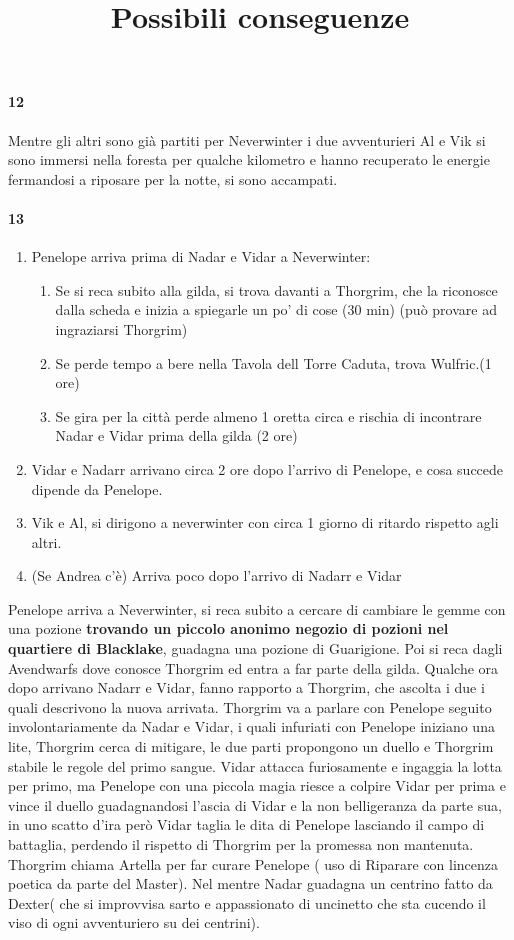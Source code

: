 \documentclass{article}
\begin{document}
                  \paragraph{12}
Mentre gli altri sono già partiti per Neverwinter i due avventurieri Al e Vik si sono immersi nella foresta per qualche kilometro e hanno recuperato le energie fermandosi a riposare per la notte, si sono accampati. 
                  \paragraph{13} 
\title{Possibili conseguenze}
   \begin{enumerate}
       \item  Penelope arriva prima di Nadar e Vidar a Neverwinter: 
        \begin{enumerate}
            \item Se si reca subito alla gilda, si trova davanti a Thorgrim, che la riconosce dalla scheda e inizia a spiegarle un po' di cose (30 min) (può provare ad ingraziarsi Thorgrim)
            \item Se perde tempo a bere nella Tavola dell Torre Caduta, trova Wulfric.(1 ore) 
            \item Se gira per la città perde almeno 1 oretta circa e rischia di incontrare Nadar e Vidar prima della gilda (2 ore)
        \end{enumerate}
        \item  Vidar e Nadarr arrivano      circa 2 ore dopo l'arrivo di Penelope, e cosa succede dipende da Penelope.
        \item Vik e Al, si dirigono a neverwinter con circa 1 giorno di ritardo rispetto agli altri.
        \item (Se Andrea c'è) Arriva poco dopo l'arrivo di Nadarr e Vidar
   \end{enumerate}
Penelope arriva a Neverwinter, si reca subito a cercare di cambiare le gemme con una pozione \textbf{trovando un piccolo anonimo negozio di pozioni nel quartiere di Blacklake}, guadagna una pozione di Guarigione. Poi si reca dagli Avendwarfs dove conosce Thorgrim ed entra a far parte della gilda. Qualche ora dopo arrivano Nadarr e Vidar, fanno rapporto a Thorgrim, che ascolta i due i quali descrivono la nuova arrivata. Thorgrim va a parlare con Penelope seguito involontariamente da Nadar e Vidar, i quali infuriati con Penelope iniziano una lite, Thorgrim cerca di mitigare, le due parti propongono un duello e Thorgrim stabile le regole del primo sangue. Vidar attacca furiosamente e ingaggia la lotta per primo, ma Penelope con una piccola magia riesce a colpire Vidar per prima e vince il duello guadagnandosi l'ascia di Vidar e la non belligeranza da parte sua, in uno scatto d'ira però Vidar taglia le dita di Penelope lasciando il campo di battaglia, perdendo il rispetto di Thorgrim per la promessa non mantenuta. Thorgrim chiama Artella per far curare Penelope ( uso di Riparare con lincenza poetica da parte del Master). Nel mentre Nadar guadagna un centrino fatto da Dexter( che si improvvisa sarto e appassionato di uncinetto che sta cucendo il viso di ogni avventuriero su dei centrini).
\end{document}
